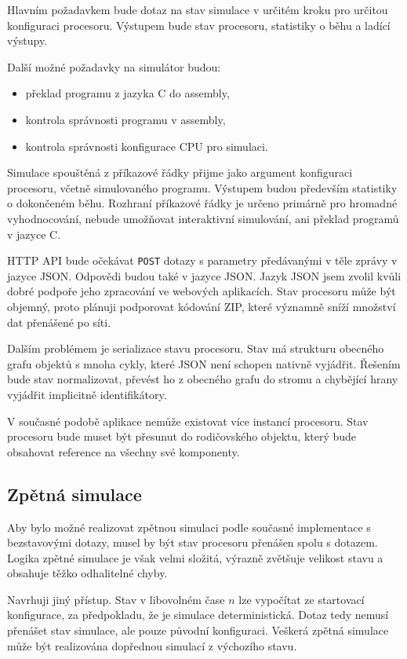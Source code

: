 Hlavním požadavkem bude dotaz na stav simulace v určitém kroku pro určitou konfiguraci procesoru.
Výstupem bude stav procesoru, statistiky o běhu a ladící výstupy.

Další možné požadavky na simulátor budou:
\begin{itemize}
    \item překlad programu z jazyka C do assembly,
    \item kontrola správnosti programu v assembly,
    \item kontrola správnosti konfigurace CPU pro simulaci.
\end{itemize}

Simulace spouštěná z příkazové řádky přijme jako argument konfiguraci procesoru, včetně simulovaného programu.
Výstupem budou především statistiky o dokončeném běhu.
Rozhraní příkazové řádky je určeno primárně pro hromadné vyhodnocování, nebude umožňovat interaktivní simulování, ani překlad programů v jazyce C.

HTTP API bude očekávat \texttt{POST} dotazy s parametry předávanými v těle zprávy v jazyce JSON.
Odpovědi budou také v jazyce JSON.
Jazyk JSON jsem zvolil kvůli dobré podpoře jeho zpracování ve webových aplikacích.
Stav procesoru může být objemný, proto plánuji podporovat kódování ZIP, které významně sníží množství dat přenášené po síti.

Dalším problémem je serializace stavu procesoru.
Stav má strukturu obecného grafu objektů s mnoha cykly, které JSON není schopen nativně vyjádřit.
Řešením bude stav normalizovat, převést ho z obecného grafu do stromu a chybějící hrany vyjádřit implicitně identifikátory. 

V současné podobě aplikace nemůže existovat více instancí procesoru.
Stav procesoru bude muset být přesunut do rodičovského objektu, který bude obsahovat reference na všechny své komponenty.

\subsection{Zpětná simulace}

Aby bylo možné realizovat zpětnou simulaci podle současné implementace s bezstavovými dotazy, musel by být stav procesoru přenášen spolu s dotazem.
Logika zpětné simulace je však velmi složitá, výrazně zvětšuje velikost stavu a obsahuje těžko odhalitelné chyby.

Navrhuji jiný přístup.
Stav v libovolném čase $n$ lze vypočítat ze startovací konfigurace, za předpokladu, že je simulace deterministická.
Dotaz tedy nemusí přenášet stav simulace, ale pouze původní konfiguraci.
Veškerá zpětná simulace může být realizována dopřednou simulací z výchozího stavu.

